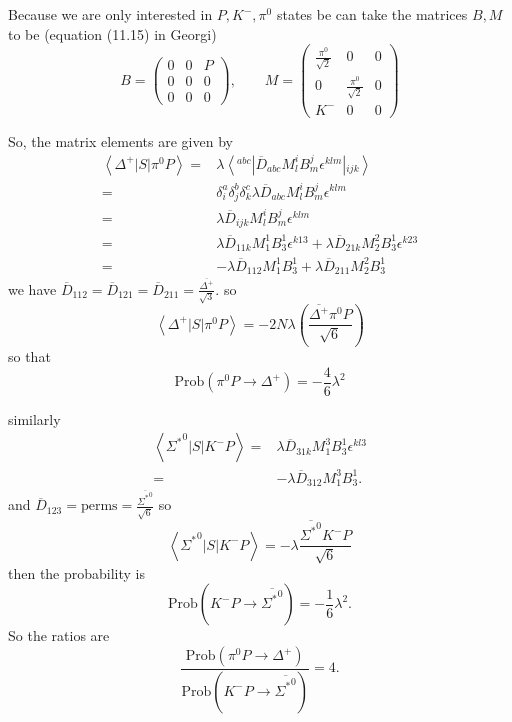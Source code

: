 \documentclass[main.tex]{subfiles}
\begin{document}
Because we are only interested in $P, K^-, \pi^0$ states be can take the matrices $B,M$ to be (equation (11.15) in Georgi)
\begin{equation}
B=\begin{pmatrix}0&0&P\\0&0&0\\0&0&0\end{pmatrix},\qquad M=\begin{pmatrix}\frac{\pi^0}{\sqrt{2}}&0&0\\0&\frac{\pi^0}{\sqrt{2}}&0\\K^-&0&0\end{pmatrix}
\end{equation}

So, the matrix elements are given by 
\begin{align}
\left<\Delta^+|S|\pi^0P\right>=&\lambda\left<^{abc}\right|\overline{D}_{abc}M^i_lB^j_m\epsilon^{klm}\left|_{ijk}\right>\\
=&\delta^a_i\delta^b_j\delta^c_k\lambda\overline{D}_{abc}M^i_lB^j_m\epsilon^{klm}\\
=&\lambda\overline{D}_{ijk}M^i_lB^j_m\epsilon^{klm}\\
=&\lambda\overline{D}_{11k}M^1_1B^1_3\epsilon^{k13}+\lambda\overline{D}_{21k}M^2_2B^1_3\epsilon^{k23}\\
=&-\lambda\overline{D}_{112}M^1_1B^1_3+\lambda\overline{D}_{211}M^2_2B^1_3
\end{align}
we have $\overline{D}_{112}=\overline{D}_{121}=\overline{D}_{211}=\frac{\overline{\Delta^+}}{\sqrt{3}}$.
so
\begin{equation}
\left<\Delta^+|S|\pi^0P\right>=-2N\lambda\left(\frac{\overline{\Delta^+}\pi^0P}{\sqrt{6}}\right)
\end{equation}
so that 
\begin{equation}
\text{Prob}(\pi^0P\rightarrow\Delta^+)=-\frac{4}{6}\lambda^2
\end{equation}

similarly
\begin{align}
\left<{\Sigma^*}^{0}|S|K^-P\right>=&\lambda\overline{D}_{31k}M^3_1B^1_3\epsilon^{kl3}\\
=&-\lambda\overline{D}_{312}M^3_1B^1_3.
\end{align}
and $\overline{D}_{123}=\text{perms}=\frac{\overline{{\Sigma^*}^0}}{\sqrt{6}}$
so
\begin{equation}
\left<{\Sigma^*}^{0}|S|K^-P\right>=-\lambda\frac{\overline{{\Sigma^*}^0}K^-P}{\sqrt{6}}
\end{equation}
then the probability is
\begin{equation}
\text{Prob}(K^-P\rightarrow\overline{{\Sigma^*}^0})=-\frac{1}{6}\lambda^2.
\end{equation}
So the ratios are
\begin{equation}
\frac{\text{Prob}(\pi^0P\rightarrow\Delta^+)}{\text{Prob}(K^-P\rightarrow\overline{{\Sigma^*}^0})}=4.
\end{equation}
\end{document}
